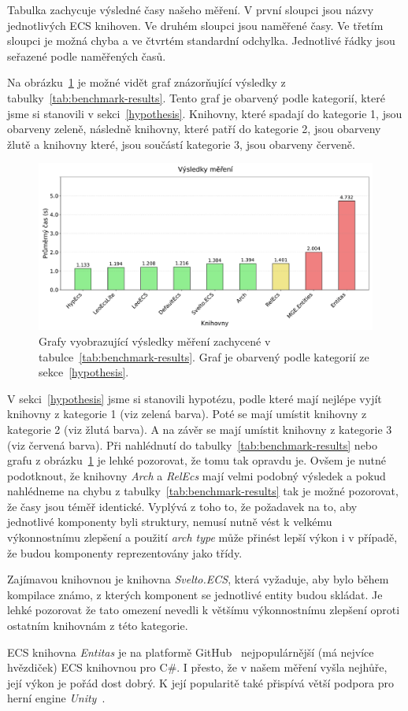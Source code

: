 Tabulka zachycuje výsledné časy našeho měření. V první sloupci jsou názvy jednotlivých ECS knihoven. Ve druhém sloupci jsou naměřené časy. Ve třetím sloupci je možná chyba a ve čtvrtém standardní odchylka. Jednotlivé řádky jsou seřazené podle naměřených časů.

Na obrázku~\ref{fig:benchmark-results} je možné vidět graf znázorňující výsledky z tabulky~\ref{tab:benchmark-results}. Tento graf je obarvený podle kategorií, které jsme si stanovili v sekci~\ref{hypothesis}. Knihovny, které spadají do kategorie 1, jsou obarveny zeleně, následně knihovny, které patří do kategorie 2, jsou obarveny žlutě a knihovny které, jsou součástí kategorie 3, jsou obarveny červeně.

\begin{figure}[!htb]
    \centering
    \includegraphics[width=1.0\linewidth]{plots/benchmark_results.pdf}
    \caption{Grafy vyobrazující výsledky měření zachycené v tabulce~\ref{tab:benchmark-results}. Graf je obarvený podle kategorií ze sekce~\ref{hypothesis}.}
    \label{fig:benchmark-results}
\end{figure}

V sekci~\ref{hypothesis} jsme si stanovili hypotézu, podle které mají nejlépe vyjít knihovny z kategorie 1 (viz zelená barva). Poté se mají umístit knihovny z kategorie 2 (viz žlutá barva). A na závěr se mají umístit knihovny z kategorie 3 (viz červená barva). Při nahlédnutí do tabulky~\ref{tab:benchmark-results} nebo grafu z obrázku~\ref{fig:benchmark-results} je lehké pozorovat, že tomu tak opravdu je. Ovšem je nutné podotknout, že knihovny \textit{Arch} a \textit{RelEcs} mají velmi podobný výsledek a pokud nahlédneme na chybu z tabulky~\ref{tab:benchmark-results} tak je možné pozorovat, že časy jsou téměř identické. Vyplývá z toho to, že požadavek na to, aby jednotlivé komponenty byli struktury, nemusí nutně vést k velkému výkonnostnímu zlepšení a použití \textit{arch type} může přinést lepší výkon i v případě, že budou komponenty reprezentovány jako třídy.

Zajímavou knihovnou je knihovna \textit{Svelto.ECS}, která vyžaduje, aby bylo během kompilace známo, z kterých komponent se jednotlivé entity budou skládat. Je lehké pozorovat že tato omezení nevedli k většímu výkonnostnímu zlepšení oproti ostatním knihovnám z této kategorie.

ECS knihovna \textit{Entitas} je na platformě GitHub~\cite{GitHub} nejpopulárnější (má nejvíce hvězdiček) ECS knihovnou pro C\#. I přesto, že v našem měření vyšla nejhůře, její výkon je pořád dost dobrý. K její popularitě také přispívá větší podpora pro herní engine \textit{Unity}~\cite{Unity}.